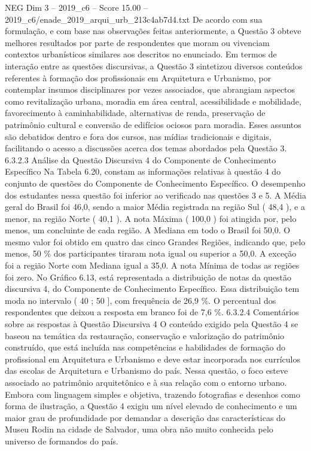 \begin{textsample}{NEG Dim 3 – 2019\_c6 – Score 15.00 – 2019\_c6/enade\_2019\_arqui\_urb\_213c4ab7d4.txt}
De acordo com sua formulação, e com base nas observações feitas anteriormente, a Questão 3 obteve melhores resultados por parte de respondentes que moram ou vivenciam contextos urbanísticos similares aos descritos no enunciado.
Em termos de interação entre as questões discursivas, a Questão 3 sintetizou diversos conteúdos referentes à formação dos profissionais em Arquitetura e Urbanismo, por contemplar insumos disciplinares por vezes associados, que abrangiam aspectos como revitalização urbana, moradia em área central, acessibilidade e mobilidade, favorecimento à caminhabilidade, alternativas de renda, preservação de patrimônio cultural e conversão de edifícios ociosos para moradia.
Esses assuntos são debatidos dentro e fora dos cursos, nas mídias tradicionais e digitais, facilitando o acesso a discussões acerca dos temas abordados pela Questão 3. 6.3.2.3 Análise da Questão Discursiva 4 do Componente de Conhecimento Específico Na Tabela 6.20, constam as informações relativas à questão 4 do conjunto de questões do Componente de Conhecimento Específico.
O desempenho dos estudantes nessa questão foi inferior ao verificado nas questões 3 e 5.
A Média geral do Brasil foi 46,0, sendo a maior Média registrada na região Sul ( 48,4 ), e a menor, na região Norte ( 40,1 ).
A nota Máxima ( 100,0 ) foi atingida por, pelo menos, um concluinte de cada região.
A Mediana em todo o Brasil foi 50,0.
O mesmo valor foi obtido em quatro das cinco Grandes Regiões, indicando que, pelo menos, 50 \% dos participantes tiraram nota igual ou superior a 50,0.
A exceção foi a região Norte com Mediana igual a 35,0.
A nota Mínima de todas as regiões foi zero.
No Gráfico 6.13, está representada a distribuição de notas da questão discursiva 4, do Componente de Conhecimento Específico.
Essa distribuição tem moda no intervalo ( 40 ; 50 ], com frequência de 26,9 \%.
O percentual dos respondentes que deixou a resposta em branco foi de 7,6 \%. 6.3.2.4 Comentários sobre as respostas à Questão Discursiva 4 O conteúdo exigido pela Questão 4 se baseou na temática da restauração, conservação e valorização do patrimônio construído, que está incluída nas competências e habilidades de formação do profissional em Arquitetura e Urbanismo e deve estar incorporada nos currículos das escolas de Arquitetura e Urbanismo do país.
Nessa questão, o foco esteve associado ao patrimônio arquitetônico e à sua relação com o entorno urbano.
Embora com linguagem simples e objetiva, trazendo fotografias e desenhos como forma de ilustração, a Questão 4 exigiu um nível elevado de conhecimento e um maior grau de profundidade por demandar a descrição das características do Museu Rodin na cidade de Salvador, uma obra não muito conhecida pelo universo de formandos do país.

\end{textsample}
